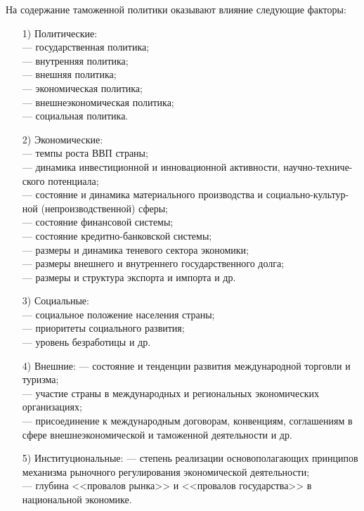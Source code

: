 На содержание таможенной политики оказывают влияние следующие факторы:
\begin{enumerate}
	\item [1)] Политические:\\
	--- государственная политика;\\
	--- внутренняя политика;\\
	--- внешняя политика;\\
	--- экономическая политика;\\
	--- внешнеэкономическая политика;\\
	--- социальная политика.
	\item [2)] Экономические:\\
	--- темпы роста ВВП страны;\\
	--- динамика инвестиционной и инновационной активности, научно-техниче-ского потенциала;\\
	--- состояние и динамика материального производства и социально-культур-ной (непроизводственной) сферы;\\
	--- состояние финансовой системы;\\
	--- состояние кредитно-банковской системы;\\
	--- размеры и динамика теневого сектора экономики;\\
	--- размеры внешнего и внутреннего государственного долга;\\
	--- размеры и структура экспорта и импорта и др.
	\item [3)] Социальные:\\
	--- социальное положение населения страны;\\
	--- приоритеты социального развития;\\
	--- уровень безработицы и др.
	\item [4)] Внешние:
	--- состояние и тенденции развития международной торговли и туризма;\\
	--- участие страны в международных и региональных экономических организациях;\\
	--- присоединение к международным договорам, конвенциям, соглашениям в сфере внешнеэкономической и таможенной деятельности и др.
	\item [5)] Институциональные:
	--- степень реализации основополагающих принципов механизма рыночного регулирования экономической деятельности;\\
	--- глубина <<провалов рынка>> и <<провалов государства>> в национальной экономике.
\end{enumerate}
















